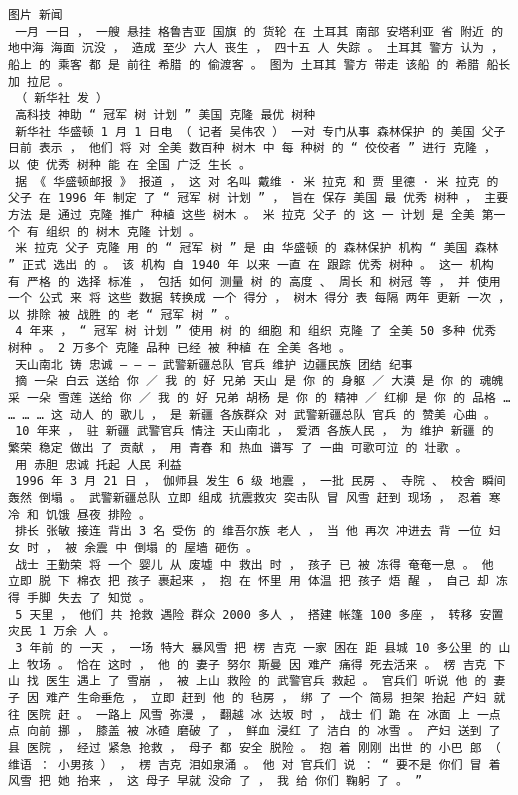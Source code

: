 \documentclass{article}
\begin{document}
\begin{Verbatim}[commandchars=\\\{\}]
 图片 新闻 
 一月 一日 ， 一艘 悬挂 格鲁吉亚 国旗 的 货轮 在 土耳其 南部 安塔利亚 省 附近 的 地中海 海面 沉没 ， 造成 至少 六人 丧生 ， 四十五 人 失踪 。 土耳其 警方 认为 ， 船上 的 乘客 都 是 前往 希腊 的 偷渡客 。 图为 土耳其 警方 带走 该船 的 希腊 船长 加 拉尼 。 
 （ 新华社 发 ） 
 高科技 神助 “ 冠军 树 计划 ” 美国 克隆 最优 树种 
 新华社 华盛顿 1 月 1 日电 （ 记者 吴伟农 ） 一对 专门从事 森林保护 的 美国 父子 日前 表示 ， 他们 将 对 全美 数百种 树木 中 每 种树 的 “ 佼佼者 ” 进行 克隆 ， 以 使 优秀 树种 能 在 全国 广泛 生长 。 
 据 《 华盛顿邮报 》 报道 ， 这 对 名叫 戴维 · 米 拉克 和 贾 里德 · 米 拉克 的 父子 在 1996 年 制定 了 “ 冠军 树 计划 ” ， 旨在 保存 美国 最 优秀 树种 ， 主要 方法 是 通过 克隆 推广 种植 这些 树木 。 米 拉克 父子 的 这 一 计划 是 全美 第一个 有 组织 的 树木 克隆 计划 。 
 米 拉克 父子 克隆 用 的 “ 冠军 树 ” 是 由 华盛顿 的 森林保护 机构 “ 美国 森林 ” 正式 选出 的 。 该 机构 自 1940 年 以来 一直 在 跟踪 优秀 树种 。 这一 机构 有 严格 的 选择 标准 ， 包括 如何 测量 树 的 高度 、 周长 和 树冠 等 ， 并 使用 一个 公式 来 将 这些 数据 转换成 一个 得分 ， 树木 得分 表 每隔 两年 更新 一次 ， 以 排除 被 战胜 的 老 “ 冠军 树 ” 。 
 4 年来 ， “ 冠军 树 计划 ” 使用 树 的 细胞 和 组织 克隆 了 全美 50 多种 优秀 树种 。 2 万多个 克隆 品种 已经 被 种植 在 全美 各地 。 
 天山南北 铸 忠诚 — — — 武警新疆总队 官兵 维护 边疆民族 团结 纪事 
 摘 一朵 白云 送给 你 ／ 我 的 好 兄弟 天山 是 你 的 身躯 ／ 大漠 是 你 的 魂魄 采 一朵 雪莲 送给 你 ／ 我 的 好 兄弟 胡杨 是 你 的 精神 ／ 红柳 是 你 的 品格 … … … … 这 动人 的 歌儿 ， 是 新疆 各族群众 对 武警新疆总队 官兵 的 赞美 心曲 。 
 10 年来 ， 驻 新疆 武警官兵 情注 天山南北 ， 爱洒 各族人民 ， 为 维护 新疆 的 繁荣 稳定 做出 了 贡献 ， 用 青春 和 热血 谱写 了 一曲 可歌可泣 的 壮歌 。 
 用 赤胆 忠诚 托起 人民 利益 
 1996 年 3 月 21 日 ， 伽师县 发生 6 级 地震 ， 一批 民房 、 寺院 、 校舍 瞬间 轰然 倒塌 。 武警新疆总队 立即 组成 抗震救灾 突击队 冒 风雪 赶到 现场 ， 忍着 寒冷 和 饥饿 昼夜 排险 。 
 排长 张敏 接连 背出 3 名 受伤 的 维吾尔族 老人 ， 当 他 再次 冲进去 背 一位 妇女 时 ， 被 余震 中 倒塌 的 屋墙 砸伤 。 
 战士 王勤荣 将 一个 婴儿 从 废墟 中 救出 时 ， 孩子 已 被 冻得 奄奄一息 。 他 立即 脱 下 棉衣 把 孩子 裹起来 ， 抱 在 怀里 用 体温 把 孩子 焐 醒 ， 自己 却 冻得 手脚 失去 了 知觉 。 
 5 天里 ， 他们 共 抢救 遇险 群众 2000 多人 ， 搭建 帐篷 100 多座 ， 转移 安置 灾民 1 万余 人 。 
 3 年前 的 一天 ， 一场 特大 暴风雪 把 楞 吉克 一家 困在 距 县城 10 多公里 的 山上 牧场 。 恰在 这时 ， 他 的 妻子 努尔 斯曼 因 难产 痛得 死去活来 。 楞 吉克 下山 找 医生 遇上 了 雪崩 ， 被 上山 救险 的 武警官兵 救起 。 官兵们 听说 他 的 妻子 因 难产 生命垂危 ， 立即 赶到 他 的 毡房 ， 绑 了 一个 简易 担架 抬起 产妇 就 往 医院 赶 。 一路上 风雪 弥漫 ， 翻越 冰 达坂 时 ， 战士 们 跪 在 冰面 上 一点点 向前 挪 ， 膝盖 被 冰碴 磨破 了 ， 鲜血 浸红 了 洁白 的 冰雪 。 产妇 送到 了 县 医院 ， 经过 紧急 抢救 ， 母子 都 安全 脱险 。 抱 着 刚刚 出世 的 小巴 郎 （ 维语 ： 小男孩 ） ， 楞 吉克 泪如泉涌 。 他 对 官兵们 说 ： “ 要不是 你们 冒 着 风雪 把 她 抬来 ， 这 母子 早就 没命 了 ， 我 给 你们 鞠躬 了 。 ” 

\end{Verbatim}
\end{document}
